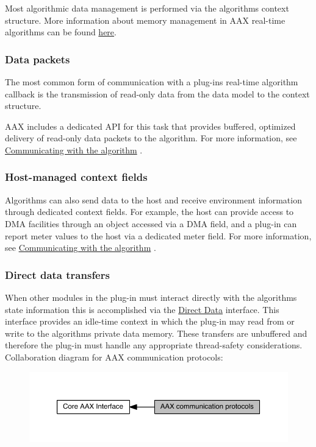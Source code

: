 Most algorithmic data management is performed via the algorithm\textquotesingle{}s context structure. More information about memory management in A\+A\+X real-\/time algorithms can be found \hyperlink{a00327_alg_memmgmt}{here}.\hypertarget{a00330_CommonInterface_Communication_algorithm_datapackets}{}\subsubsection{Data packets}\label{a00330_CommonInterface_Communication_algorithm_datapackets}
The most common form of communication with a plug-\/in\textquotesingle{}s real-\/time algorithm callback is the transmission of read-\/only data from the data model to the context structure.

A\+A\+X includes a dedicated A\+P\+I for this task that provides buffered, optimized delivery of read-\/only data packets to the algorithm. For more information, see \hyperlink{a00327_alg_comm}{Communicating with the algorithm} .\hypertarget{a00330_CommonInterface_Communication_algorithm_fields}{}\subsubsection{Host-\/managed context fields}\label{a00330_CommonInterface_Communication_algorithm_fields}
Algorithms can also send data to the host and receive environment information through dedicated context fields. For example, the host can provide access to D\+M\+A facilities through an object accessed via a D\+M\+A field, and a plug-\/in can report meter values to the host via a dedicated meter field. For more information, see \hyperlink{a00327_alg_comm}{Communicating with the algorithm} .\hypertarget{a00330_CommonInterface_Communication_algorithm_directdata}{}\subsubsection{Direct data transfers}\label{a00330_CommonInterface_Communication_algorithm_directdata}
When other modules in the plug-\/in must interact directly with the algorithm\textquotesingle{}s state information this is accomplished via the \hyperlink{a00333}{Direct Data} interface. This interface provides an idle-\/time context in which the plug-\/in may read from or write to the algorithm\textquotesingle{}s private data memory. These transfers are unbuffered and therefore the plug-\/in must handle any appropriate thread-\/safety considerations. Collaboration diagram for A\+A\+X communication protocols\+:
\nopagebreak
\begin{figure}[H]
\begin{center}
\leavevmode
\includegraphics[width=350pt]{a00330}
\end{center}
\end{figure}
